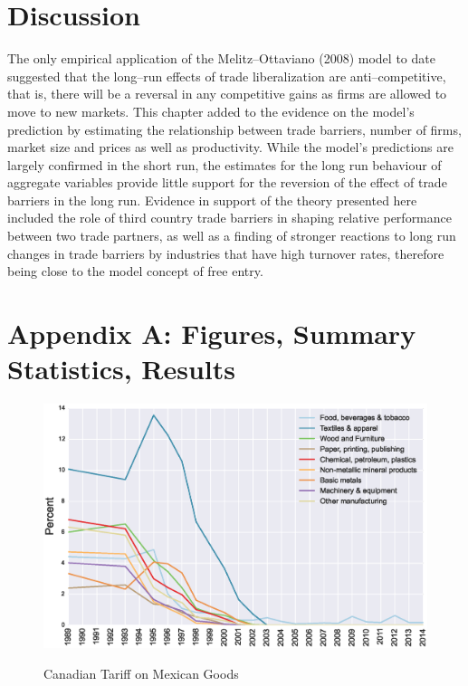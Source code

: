 \section{Discussion}\label{sec:conc}
The only empirical application of the Melitz--Ottaviano (2008) model to date 
suggested that the long--run effects of trade liberalization are anti--competitive,
 that is, there will be a reversal in any competitive gains as firms are allowed
 to move to new markets. This chapter added to the evidence on the model's
prediction by estimating the relationship between trade barriers, number of 
firms, market size and prices as well as productivity. While the model's 
predictions are largely confirmed in the short run, the estimates for the 
long run behaviour of aggregate variables provide little support for the 
reversion of the effect of trade barriers in the long run. Evidence in support
of the theory presented here included the role of third country trade barriers
in shaping relative performance between two trade partners, as well as a finding
of stronger reactions to long run changes in trade barriers by industries that
have high turnover rates, therefore being close to the model concept of free entry.

\newpage

\section{Appendix A: Figures, Summary Statistics, Results}

\begin{figure}[htpb]\centering
\caption{Canadian Tariff on Mexican Goods}\vspace{0.2cm}
\includegraphics[scale=0.5]{tau_can_mex}
\label{fig:can_mex}
\end{figure} 

